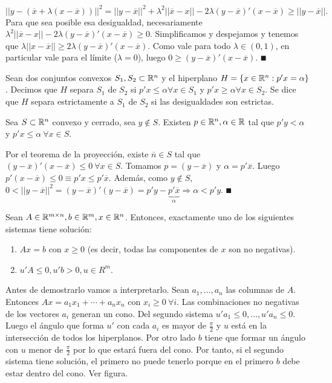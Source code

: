 \documentclass[PM.tex]{subfiles}
\begin{document}
\begin{dem}
\[
||y-(\overline{x}+\lambda(x-\overline{x}))||^2=||y-\overline{x}||^2+\lambda^2||\overline{x}-x||-2\lambda(y-\overline{x})'(x-\overline{x})\geq||y-\overline{x}||.
\]
Para que sea posible esa desigualdad, necesariamente $\lambda^2||\overline{x}-x||-2\lambda(y-\overline{x})'(x-\overline{x})\geq 0$. Simplificamos y despejamos y tenemos que $\lambda||x-\overline{x}||\geq 2\lambda(y-\overline{x})'(x-\overline{x})$. Como vale para todo $\lambda\in (0,1)$, en particular vale para el límite ($\lambda=0$), luego $0\geq (y-\overline{x})'(x-\overline{x})$. $\QED$
\end{dem}

\begin{defi} Sean dos conjuntos convexos $S_1,S_2\subset\mathbb{R}^n$ y el hiperplano $H=\{x\in\mathbb{R}^n: p'x=\alpha\}$. Decimos que $H$ separa $S_1$ de $S_2$ si $p'x\leq\alpha \forall x\in S_1$ y $p'x\geq\alpha \forall x\in S_2$. Se dice que $H$ separa estrictamente a $S_1$ de $S_2$ si las desigualdades son estrictas.
\end{defi}

\begin{lema}
Sea $S\subset\mathbb{R}^n$ convexo y cerrado, sea $y\not\in S$. Existen $p\in\mathbb{R}^n, \alpha\in\mathbb{R}$ tal que $p'y<\alpha$ y $p'x\leq\alpha\ \forall x\in S$.
\end{lema}
\begin{dem}
Por el teorema de la proyección, existe $\overline{n}\in S$ tal que $(y-\overline{x})'(x-\overline{x})\leq 0\ \forall x\in S$. Tomamos $p=(y-\overline{x})$ y $\alpha=p' \overline{x}$. Luego $p'(x-\overline{x})\leq 0\equiv p'x\leq p'\overline{x}$. Además, como $y\not\in S$, $0<||y-\overline{x}||^2=(y-\overline{x})'(y-\overline{x})=p'y-\underbrace{p'\overline{x}}_\alpha \Rightarrow \alpha <p'y$. $\QED$
\end{dem}

\newpage

\begin{lema}[de Farkas]
Sean $A\in \mathbb{R}^{m\times n}, b\in\mathbb{R}^m,x\in\mathbb{R}^n$. Entonces, exactamente uno de los siguientes sistemas tiene solución:
\begin{enumerate}
\item $Ax=b$ con $x\geq 0$ (es decir, todas las componentes de $x$ son no negativas).
\item $u'A\leq 0, u'b>0, u\in R^m$.
\end{enumerate}
\end{lema}

Antes de demostrarlo vamos a interpretarlo. Sean $a_1,\dots, a_n$ las columnas de $A$. Entonces $Ax=a_1x_1+\cdots +a_nx_n$ con $x_i\geq 0\ \forall i$. Las combinaciones no negativas de los vectores $a_i$ generan un cono. Del segundo sistema $u'a_1\leq 0,\dots , u'a_n\leq 0$. Luego el ángulo que forma $u'$ con cada $a_i$ es mayor de $\frac{\pi}{2}$ y $u$ está en la intersección de todos los hiperplanos. Por otro lado $b$ tiene que formar un ángulo con $u$ menor de $\frac{\pi}{2}$ por lo que estará fuera del cono. Por tanto, si el segundo sistema tiene solución, el primero no puede tenerlo porque en el primero $b$ debe estar dentro del cono. Ver figura.
\end{document}
